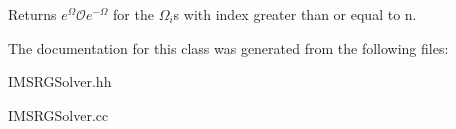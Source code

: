 Returns $ e^{\Omega} \mathcal{O} e^{-\Omega} $ for the $\Omega_i$s with index greater than or equal to n. 

The documentation for this class was generated from the following files\+:\begin{DoxyCompactItemize}
\item 
I\+M\+S\+R\+G\+Solver.\+hh\item 
I\+M\+S\+R\+G\+Solver.\+cc\end{DoxyCompactItemize}
